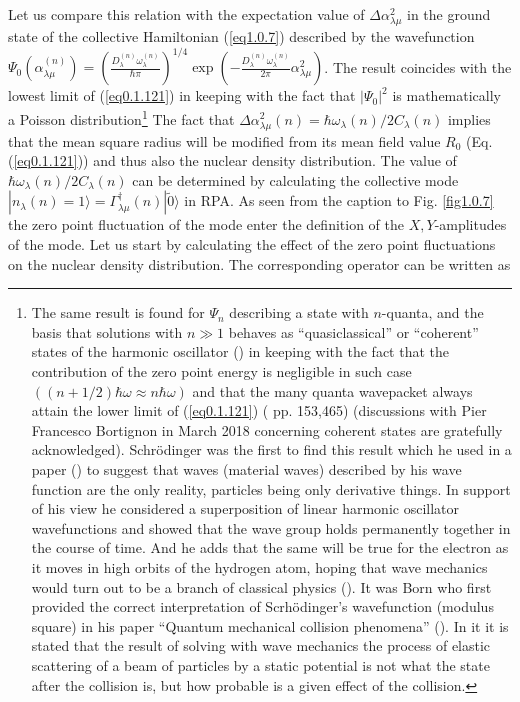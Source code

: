 \documentclass[a4paper,11pt]{book}
\numberwithin{equation}{section}
\numberwithin{figure}{section}
\numberwithin{table}{section}
\newcommand{\ket}[1]{|{#1} \rangle }
\begin{document}
Let us compare this relation with the expectation value of $\Delta\alpha^2_{\lambda\mu}$ in the ground state of the collective Hamiltonian (\ref{eq1.0.7}) described by the wavefunction $\Psi_0(\alpha^{(n)}_{\lambda\mu})=\left(\frac{D^{(n)}_{\lambda}\omega^{(n)}_\lambda}{\hbar\pi}\right)^{1/4}\exp\left(-\frac{D^{(n)}_{\lambda}\omega^{(n)}_\lambda}{2\pi}\alpha_{\lambda\mu}^2\right)$. The result coincides with the lowest limit of (\ref{eq0.1.121}) in keeping with the fact that $|\Psi_0|^2$ is mathematically a Poisson distribution\footnote{The same result is found for $\Psi_n$ describing a state with $n$-quanta, and the basis that solutions with $n\gg1$ behaves as ``quasiclassical'' or ``coherent'' states of the harmonic oscillator (\cite{Glauber:07}) in keeping with the fact that the contribution of the zero point energy is negligible in such case $((n+1/2)\hbar\omega\approx n\hbar\omega)$ and that the many quanta wavepacket always attain the lower limit of (\ref{eq0.1.121}) (\cite{Basdevant:05} pp. 153,465) (discussions with Pier Francesco Bortignon in March 2018 concerning coherent states are gratefully acknowledged). Schr\"odinger was the first to find this result which he used in a paper (\cite{Schrodinger:26}) to suggest that waves (material waves) described by his wave function are the only reality, particles being only derivative things. In support of his view he considered a superposition of linear harmonic oscillator wavefunctions and showed that the wave group holds permanently together in the course of time. And he adds that the same will be true for the electron as it moves in high orbits of the hydrogen atom, hoping that wave mechanics would turn out to be a branch of classical physics (\cite{Pais:86}). It was Born who first provided the correct interpretation of Scrh\"odinger's wavefunction (modulus square) in his paper ``Quantum mechanical collision phenomena'' (\cite{Born:26}). In it it is stated that the result of solving with wave mechanics the process of elastic scattering of a beam of particles by a static potential is not what the state after the collision is, but how probable is a given effect of the collision.} The fact that $\Delta\alpha^2_{\lambda\mu}(n)=\hbar\omega_\lambda(n)/2C_\lambda(n)$ implies that the mean square radius will be modified from its mean field value $R_0$ (Eq. (\ref{eq0.1.121})) and thus also the nuclear density distribution. The value of $\hbar\omega_\lambda(n)/2C_\lambda(n)$ can be determined by calculating the collective mode $\ket{n_\lambda(n)=1}=\Gamma_{\lambda\mu}^\dagger(n)\ket{\tilde 0}$ in RPA. As seen from the caption to Fig. \ref{fig1.0.7} the zero point fluctuation of the mode enter the definition of the $X,Y$-amplitudes of the mode. Let us start by calculating the effect of the zero point fluctuations on the nuclear density distribution. The corresponding operator can be written as
\end{document}
